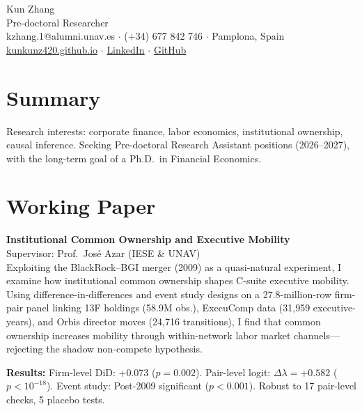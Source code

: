 \documentclass[9.5pt, letterpaper]{article}
\begin{document}
\thispagestyle{empty}

\begin{center}
  {\boldfont\LARGE Kun Zhang}\\[2pt]
  {\small Pre-doctoral Researcher}\\[4pt]
  {\small
    kzhang.1@alumni.unav.es \;$\cdot$\; (+34) 677 842 746 \;$\cdot$\; Pamplona, Spain\\[3pt]
    \href{https://kunkunz420.github.io}{kunkunz420.github.io}
    \;$\cdot$\;
    \href{https://linkedin.com/in/kun-zhang-a52627351}{LinkedIn}
    \;$\cdot$\;
    \href{https://github.com/kunkunz420}{GitHub}
  }
\end{center}

\section*{Summary}

\small
Research interests: corporate finance, labor economics, institutional ownership, causal inference.
Seeking Pre-doctoral Research Assistant positions (2026--2027), with the long-term goal of a
Ph.D.\ in Financial Economics.

\section*{Working Paper}

\noindent\textbf{Institutional Common Ownership and Executive Mobility}\\[2pt]
{\small Supervisor: Prof.\ Jos\'e Azar (IESE \& UNAV)}\\[3pt]

\small
Exploiting the BlackRock--BGI merger (2009) as a quasi-natural experiment, I examine how
institutional common ownership shapes C-suite executive mobility. Using difference-in-differences
and event study designs on a 27.8-million-row firm-pair panel linking 13F holdings (58.9M obs.),
ExecuComp data (31,959 executive-years), and Orbis director moves (24,716 transitions), I find
that common ownership increases mobility through within-network labor market channels---rejecting
the shadow non-compete hypothesis.

\textbf{Results:} Firm-level DiD: +0.073 ($p = 0.002$). Pair-level logit:
$\Delta\lambda = +0.582$ ($p < 10^{-18}$). Event study: Post-2009 significant
($p < 0.001$). Robust to 17 pair-level checks, 5 placebo tests.
\end{document}
